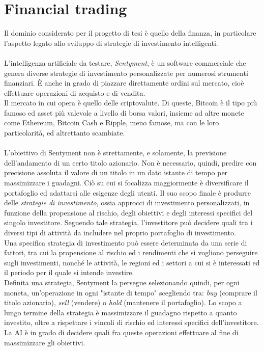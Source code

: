 \documentclass[a4paper,12pt]{report}
\begin{document}
\chapter{Financial trading}
\label{cap1}
Il dominio considerato per il progetto di tesi è quello della finanza, in particolare l'aspetto legato allo sviluppo di strategie di investimento intelligenti.\\~\\
L'intelligenza artificiale da testare, \textit{Sentyment}, è un software commerciale che genera diverse strategie di investimento personalizzate per numerosi strumenti finanziari. È anche in grado di piazzare direttamente ordini sul mercato, cioè effettuare operazioni di acquisto e di vendita.\\ Il mercato in cui opera è quello delle criptovalute. Di queste, Bitcoin è il tipo più famoso ed asset più valevole a livello di borsa valori, insieme ad altre monete come Ethereum, Bitcoin Cash e Ripple, meno famose, ma con le loro particolarità, ed altrettanto scambiate.\\~\\
L'obiettivo di Sentyment non è strettamente, e solamente, la previsione dell'andamento di un certo titolo azionario. Non è necessario, quindi, predire con precisione assoluta il valore di un titolo in un dato istante di tempo per massimizzare i guadagni. Ciò su cui si focalizza maggiormente è diversificare il portafoglio ed adattarsi alle esigenze degli utenti. Il suo scopo finale è produrre delle \textit{strategie di investimento}, ossia approcci di investimento personalizzati, in funzione della propensione al rischio, degli obiettivi e degli interessi specifici del singolo investitore. Seguendo tale strategia, l’investitore può decidere quali tra i diversi tipi di attività da includere nel proprio portafoglio di investimento.\\
Una specifica strategia di investimento può essere determinata da una serie di fattori, tra cui la propensione al rischio ed i rendimenti che si vogliono perseguire sugli investimenti, nonché le attività, le regioni ed i settori a cui si è interessati ed il periodo per il quale si intende investire.\\
Definita una strategia, Sentyment la persegue selezionando quindi, per ogni moneta, un'operazione in ogni "istante di tempo" scegliendo tra: \textit{buy} (comprare il titolo azionario), \textit{sell} (vendere) o \textit{hold} (mantenere il portafoglio). Lo scopo a lungo termine della strategia è massimizzare il guadagno rispetto a quanto investito, oltre a rispettare i vincoli di rischio ed interessi specifici dell'investitore. La AI è in grado di decidere quali fra queste operazioni effettuare al fine di massimizzare gli obiettivi.\\
\end{document}
